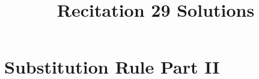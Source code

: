 \documentclass[nooutcomes]{ximera}
\title{Recitation 29 Solutions}
\renewcommand{\d}{\,d}
\renewenvironment{freeResponse}{
\ifhandout\setbox0\vbox\bgroup\else
\begin{trivlist}\item[\hskip \labelsep\bfseries Solution:\hspace{2ex}]
\fi}
{\ifhandout\egroup\else
\end{trivlist}
\fi}
\begin{document}
\begin{abstract}		\end{abstract}
\maketitle

\section{Substitution Rule Part II }
	
		
\end{document}
